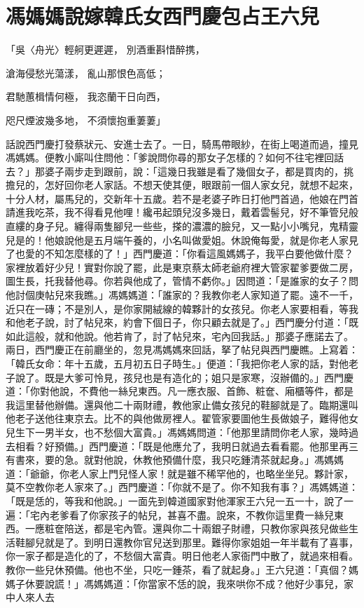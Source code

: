 %

\chapter{馮媽媽說嫁韓氏女\KG 西門慶包占王六兒}

「吳〈舟光〉輕舸更遲遲，  別酒重斟惜醉携，

滄海侵愁光蕩漾，  亂山那恨色高低；

君馳蕙楫情何極，  我恣蘭干日向西，

咫尺煙波幾多地，  不須懷抱重萋萋」

話說西門慶打發蔡狀元、安進士去了。一日，騎馬帶眼紗，在街上喝道而過，撞見馮媽媽。便教小廝叫住問他：「爹說問你尋的那女子怎樣的？如何不往宅裡回話去？」那婆子兩步走到跟前，說：「這幾日我雖是看了幾個女子，都是買肉的，挑擔兒的，怎好回你老人家話。不想天使其便，眼跟前一個人家女兒，就想不起來，十分人材，屬馬兒的，交新年十五歲。若不是老婆子昨日打他門首過，他娘在門首請進我吃茶，我不得看見他哩！纔弔起頭兒沒多幾日，戴着雲髻兒，好不筆管兒般直縷的身子兒。纏得兩隻腳兒一些些，搽的濃濃的臉兒，又一點小小嘴兒，鬼精靈兒是的！他娘說他是五月端午養的，小名叫做愛姐。休說俺每愛，就是你老人家見了也愛的不知怎麼樣的了！」西門慶道：「你看這風媽媽子，我平白要他做什麼？家裡放着好少兒！實對你說了罷，此是東京蔡太師老爺府裡大管家翟爹要做二房，圖生長，托我替他尋。你若與他成了，管情不虧你。」因問道：「是誰家的女子？問他討個庚帖兒來我瞧。」馮媽媽道：「誰家的？我教你老人家知道了罷。遠不一千，近只在一磚；不是別人，是你家開絨線的韓夥計的女孩兒。你老人家要相看，等我和他老子說，討了帖兒來，約會下個日子，你只顧去就是了。」西門慶分付道：「既如此這般，就和他說。他若肯了，討了帖兒來，宅內回我話。」那婆子應諾去了。兩日，西門慶正在前廳坐的，忽見馮媽媽來回話，拏了帖兒與西門慶瞧。上寫着：「韓氏女命：年十五歲，五月初五日子時生。」便道：「我把你老人家的話，對他老子說了。既是大爹可怜見，孩兒也是有造化的；姐只是家寒，沒辦備的。」西門慶道：「你對他說，不費他一絲兒東西。凡一應衣服、首飾、粧奩、廂櫃等件，都是我這里替他辦備。還與他二十兩財禮，教他家止備女孩兒的鞋腳就是了。臨期還叫他老子送他往東京去。比不的與他做房裡人。翟管家要圖他生長做娘子，難得他女兒生下一男半女，也不愁個大富貴。」馮媽媽問道：「他那里請問你老人家，幾時過去相看？好預備。」西門慶道：「既是他應允了，我明日就過去看看罷。他那里再三有書來，要的急。就對他說，休教他預備什麼，我只吃鍾清茶就起身。」馮媽媽道：「爺爺，你老人家上門兒怪人家！就是雖不稀罕他的，也略坐坐兒。夥計家，莫不空教你老人家來了。」西門慶道：「你就不是了。你不知我有事？」馮媽媽道：「既是恁的，等我和他說。」一面先到韓道國家對他渾家王六兒一五一十，說了一遍：「宅內老爹看了你家孩子的帖兒，甚喜不盡。說來，不教你這里費一絲兒東西。一應粧奩陪送，都是宅內管。還與你二十兩銀子財禮，只教你家與孩兒做些生活鞋腳兒就是了。到明日還教你官兒送到那里。難得你家姐姐一年半載有了喜事，你一家子都是造化的了，不愁個大富貴。明日他老人家衙門中散了，就過來相看。教你一些兒休預備。他也不坐，只吃一鍾茶，看了就起身。」王六兒道：「真個？媽媽子休要說謊！」馮媽媽道：「你當家不恁的說，我來哄你不成？他好少事兒，家中人來人去